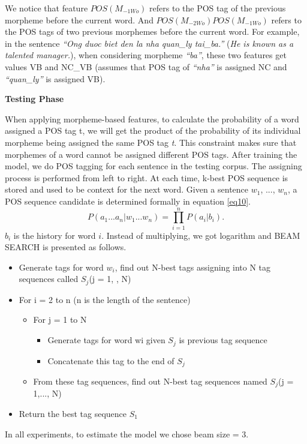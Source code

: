 \documentclass[english]{jnlp_1.4}
\begin{document}
We notice that feature $POS(M_{-1Wo})$ refers to the POS tag of the previous morpheme before the
 current word.
And $POS(M_{-2Wo})$$POS(M_{-1Wo})$ refers to the POS tags of two previous morphemes before the current word.
   For example, in the sentence \emph{``Ong duoc biet den la nha quan\_ly tai\_ba.''} (\emph{He is known as a talented manager.}), when considering morpheme \emph{``ba''}, these two features get values VB and NC\_VB (assumes that POS tag of \emph{``nha''} is assigned NC and \emph{``quan\_ly''} is assigned VB).
	

\textbf{Testing Phase}

When applying morpheme-based features, to calculate the probability of a
word assigned a POS tag t, we will get the product of the probability of its individual morpheme being assigned the same POS tag \emph{t}. This constraint makes sure that morphemes of a word cannot be assigned different POS tags.	 		 After training the model, we do POS tagging for each sentence in the testing corpus.
		The assigning process is performed from left to right. At each time, k-best POS sequence is stored
		and used to be context for the next word. Given a sentence $w_{1}$, ..., $w_{n}$, a POS sequence candidate is determined formally in equation \ref{eq10}.
\begin{equation}\label{eq10}
    P(a_{1}...a_{n}|w_{1}...w_{n}) = \prod_{i=1}^n P(a_i | b_i) .
\end{equation}
	$b_{i}$ is the history for word $i$. Instead of multiplying, we got logarithm and BEAM SEARCH is presented as follows.
 \begin{itemize}
   \item Generate tags for word $w_i$, find out N-best tags assigning into N tag sequences called $S_j$(j = 1, , N)
   \item For i = 2 to n (n is the length of the sentence)
\begin{itemize}
  \item For j = 1 to N
    \begin{itemize}
      \item Generate tags for word wi given $S_j$ is previous tag sequence
      \item Concatenate this tag to the end of $S_j$
    \end{itemize}
  \item From these tag sequences, find out N-best tag sequences named $S_j$(j = 1,..., N)
\end{itemize}
   \item Return the best tag sequence $S_1$
 \end{itemize}
In all experiments, to estimate the model we chose beam size = 3.
\end{document}
